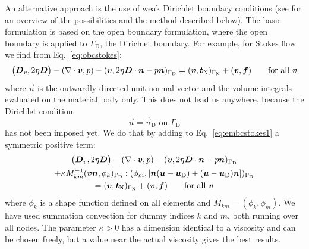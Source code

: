 An alternative approach is the use of weak Dirichlet boundary conditions
(see \cite{Choi11} for an overview of the possibilities and the method
described below).
The basic formulation is based on the open boundary formulation, where the open
boundary is applied to $\Gamma_\text{D}$, the Dirichlet boundary. For example, for
Stokes flow we find from Eq.~\eqref{eq:obcstokes}:
\begin{equation}
  \big(\boldsymbol{D}_v,2\eta\boldsymbol{D}\big)
    -(\nabla\cdot\boldsymbol{v},p)
    -(\boldsymbol{v},2\eta \boldsymbol{D}\cdot\boldsymbol{n}-p\boldsymbol{n})_{\Gamma_{\text{D}}}=
(\boldsymbol{v},\boldsymbol{t}_{\text{N}})_{\Gamma_{\text{N}}}+(\boldsymbol{v},\boldsymbol{f})
\qquad\text{for all }\boldsymbol{v}
\label{eq:embcstokes1}
\end{equation}
where $\vec n$ is the outwardly directed unit normal vector and 
the volume integrals evaluated on the material body only. This does not lead us
anywhere, because the Dirichlet condition:
\begin{equation}
    \vec u = \vec u_\text{D}\text{ on }\Gamma_\text{D}
\end{equation}
has not been imposed yet. We do that by adding to 
 Eq.~\eqref{eq:embcstokes1} a symmetric positive term:
\begin{multline}
  \big(\boldsymbol{D}_v,2\eta\boldsymbol{D}\big)
    -(\nabla\cdot\boldsymbol{v},p)
    -(\boldsymbol{v},2\eta \boldsymbol{D}\cdot\boldsymbol{n}-p\boldsymbol{n})_{\Gamma_{\text{D}}}\\
 +\kappa M_{km}^{-1}(\boldsymbol{v}\boldsymbol{n},\phi_k)_{\Gamma_\text{D}}:(\phi_m,[\boldsymbol{n}(\boldsymbol{u}-\boldsymbol{u}_\text{D})+(\boldsymbol{u}-\boldsymbol{u}_\text{D})\boldsymbol{n}])_{\Gamma_\text{D}}\\
=(\boldsymbol{v},\boldsymbol{t}_{\text{N}})_{\Gamma_{\text{N}}}+(\boldsymbol{v},\boldsymbol{f})
\qquad\text{for all }\boldsymbol{v}
\label{eq:embcstokes2}
\end{multline}
where $\phi_k$ is a shape function defined on all elements and
$M_{km}=(\phi_k,\phi_m)$.
We have used summation convection for dummy indices $k$ and $m$,
both running over all nodes.
 The parameter $\kappa>0$ has a dimension
identical to a viscosity and can be chosen freely, but a value near the actual
viscosity gives the best results.

